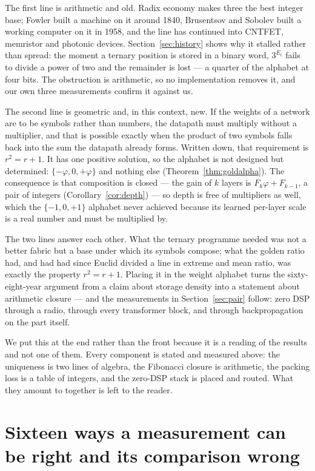 \documentclass[11pt]{article}
\theoremstyle{definition}
\begin{document}
The first line is arithmetic and old. Radix economy makes three the best integer
base; Fowler built a machine on it around 1840, Brusentsov and Sobolev built a
working computer on it in 1958, and the line has continued into CNTFET, memristor
and photonic devices. Section~\ref{sec:history} shows why it stalled rather than
spread: the moment a ternary position is stored in a binary word, $3^{E_t}$ fails
to divide a power of two and the remainder is lost --- a quarter of the alphabet
at four bits. The obstruction is arithmetic, so no implementation removes it, and
our own three measurements confirm it against us.

The second line is geometric and, in this context, new. If the weights of a
network are to be symbols rather than numbers, the datapath must multiply without
a multiplier, and that is possible exactly when the product of two symbols falls
back into the sum the datapath already forms. Written down, that requirement is
$r^2 = r + 1$. It has one positive solution, so the alphabet is not designed but
determined: $\{-\varphi, 0, +\varphi\}$ and nothing else
(Theorem~\ref{thm:goldalpha}). The consequence is that composition is closed ---
the gain of $k$ layers is $F_k\varphi + F_{k-1}$, a pair of integers
(Corollary~\ref{cor:depth}) --- so depth is free of multipliers as well, which the
$\{-1,0,+1\}$ alphabet never achieved because its learned per-layer scale is a
real number and must be multiplied by.

The two lines answer each other. What the ternary programme needed was not a
better fabric but a base under which its symbols compose; what the golden ratio
had, and had had since Euclid divided a line in extreme and mean ratio, was
exactly the property $r^2 = r + 1$. Placing it in the weight alphabet turns the
sixty-eight-year argument from a claim about storage density into a statement
about arithmetic closure --- and the measurements in Section~\ref{sec:pair}
follow: zero DSP through a radio, through every transformer block, and through
backpropagation on the part itself.

We put this at the end rather than the front because it is a reading of the
results and not one of them. Every component is stated and measured above:
the uniqueness is two lines of algebra, the Fibonacci closure is arithmetic, the
packing loss is a table of integers, and the zero-DSP stack is placed and routed.
What they amount to together is left to the reader.



\section{Sixteen ways a measurement can be right and its comparison wrong}
\label{sec:selfcheck}
\end{document}
